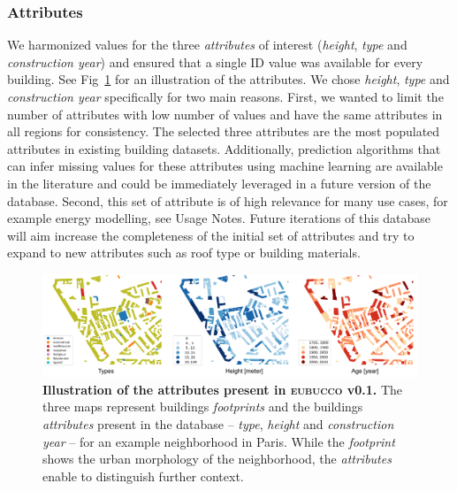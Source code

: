 \documentclass[fleqn,10pt]{wlscirep}
\begin{document}
\subsubsection*{Attributes} 
We harmonized values for the three \textit{attributes} of interest (\textit{height}, \textit{type} and \textit{construction year}) and ensured that a single ID value was available for every building. See Fig~\ref{fig:db_content} for an illustration of the attributes. We chose \textit{height}, \textit{type} and \textit{construction year} specifically for two main reasons. First, we wanted to limit the number of attributes with low number of values and have the same attributes in all regions for consistency. The selected three attributes are the most populated attributes in existing building datasets\cite{biljecki2021open}. Additionally, prediction algorithms that can infer missing values for these attributes using machine learning are available in the literature\cite{milojevic2020learning,rosser2019predicting,sturrock2018predicting} and could be immediately leveraged in a future version of the database. Second, this set of attribute is of high relevance for many use cases, for example energy modelling, see Usage Notes. Future iterations of this database will aim increase the completeness of the initial set of attributes and try to expand to new attributes such as roof type or building materials.

\begin{figure}[h]
\centering
\includegraphics[width=\linewidth]{figs/db_content.png}
\caption{\textbf{Illustration of the attributes present in \textsc{eubucco} v0.1.} The three maps represent buildings \textit{footprints} and the buildings \textit{attributes} present in the database -- \textit{type}, \textit{height} and \textit{construction year} -- for an example neighborhood in Paris. While the \textit{footprint} shows the urban morphology of the neighborhood, the \textit{attributes} enable to distinguish further context.}
\label{fig:db_content}
\end{figure}
\end{document}
